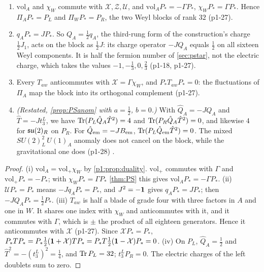\begin{proposition}
\label{p1:prop:block}
\begin{enumerate}[label=(\roman*),leftmargin=2.2em]
\item $\mathrm{vol}_A$ and $\chi_W$ commute with $\mathcal X,\mathcal Z,\mathcal U$, and $\mathrm{vol}_AP_*=-\Gamma P_*$, $\chi_WP_*=\Gamma P_*$. Hence $\Pi_AP_*=P_L$ and $\Pi_WP_*=P_R$, the two Weyl blocks of rank
$32$ (p1-27).
\item $q_AP_*=JP_*$. So $Q_A=\tfrac12q_A$, the third-rung form of the construction's charge $\tfrac12J_1$, acts on the block as $\tfrac12J$: its charge operator
$-JQ_A$ equals $\tfrac12$ on all sixteen Weyl components. It is half the fermion number of \cref{sec:pstar}, not the electric charge, which takes the values
$-1,-\tfrac13,0,\tfrac23$ (p1-18, p1-27).
\item Every $T_{aw}$ anticommutes with $\mathcal X=\Gamma\chi_W$, and $P_*T_{aw}P_*=0$: the fluctuations of $\Pi_A$ map the block into its orthogonal complement (p1-27).
\item \emph{(Restated, \cref{prop:PSanom} with $a=\tfrac12$, $b=0$.)} With $\hat Q_A=-JQ_A$ and $\hat T=-Jt^L_3$, we have $\operatorname{Tr}(P_L\hat Q_A\hat T^2)=4$ and
$\operatorname{Tr}(P_R\hat Q_A\hat T^2)=0$, and likewise $4$ for $\mathfrak{su}(2)_R$ on $P_R$. For $\hat Q_{\rm em}=-JB_{\rm em}$, $\operatorname{Tr}(P_L\hat Q_{\rm em}\hat T^2)=0$. The mixed $SU(2)_L^2\,U(1)_A$ anomaly does
not cancel on the block, while the gravitational one does (p1-28) \cite{BouchiatIliopoulosMeyer72,GeorgiGlashow72}.
\end{enumerate}
\end{proposition}

\begin{proof}
(i) $\mathrm{vol}_A=\mathrm{vol}_+\chi_W$ by \cref{p1:prop:duality}. $\mathrm{vol}_+$ commutes with $\Gamma$ and $\mathrm{vol}_+P_*=-P_*$; with $\chi_WP_*=\Gamma P_*$
\cref{thm:PS} this gives $\mathrm{vol}_AP_*=-\Gamma P_*$. (ii) $\mathcal UP_*=P_*$ means $-Jq_AP_*=P_*$, and $J^2=-\mathbf 1$ gives $q_AP_*=JP_*$; then $-JQ_AP_*=\tfrac12P_*$. (iii)
$T_{aw}$ is half a blade of grade four with three factors in $A$ and one in $W$. It shares one index with $\chi_W$ and anticommutes with it, and it commutes with $\Gamma$,
which is $\pm$ the product of all eighteen generators. Hence it anticommutes with $\mathcal X$ (p1-27).
Since $\mathcal XP_*=P_*$, $P_*TP_*=P_*\tfrac12(\mathbf 1+\mathcal X)TP_*=P_*T\tfrac12(\mathbf 1-\mathcal X)P_*=0$. (iv) On $P_L$, $\hat Q_A=\tfrac12$ and $\hat T^2=-(t^L_3)^2=\tfrac14$, and $\operatorname{Tr} P_L=32$; $t^L_3P_R=0$. The electric charges of the left doublets sum to zero.
\end{proof}


